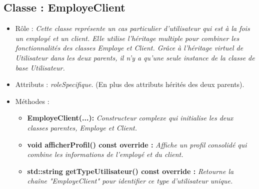 \subsection{Classe : EmployeClient}
\begin{itemize}[leftmargin=*]
\item Rôle : \textit{Cette classe représente un cas particulier d'utilisateur qui est à la fois un employé et un client. Elle utilise l'héritage multiple pour combiner les fonctionnalités des classes Employe et Client. Grâce à l'héritage virtuel de Utilisateur dans les deux parents, il n'y a qu'une seule instance de la classe de base Utilisateur.}
\item Attributs : \textit{roleSpecifique.} (En plus des attributs hérités des deux parents).
\item Méthodes : 
     \begin{itemize}[leftmargin=*]
      \item \textbf{EmployeClient(...):} \textit{Constructeur complexe qui initialise les deux classes parentes, Employe et Client.}
      \item \textbf{void afficherProfil() const override :} \textit{Affiche un profil consolidé qui combine les informations de l'employé et du client.}
      \item \textbf{std::string getTypeUtilisateur() const override :} \textit{Retourne la chaîne "EmployeClient" pour identifier ce type d'utilisateur unique.}
      \end{itemize}
\end{itemize}

